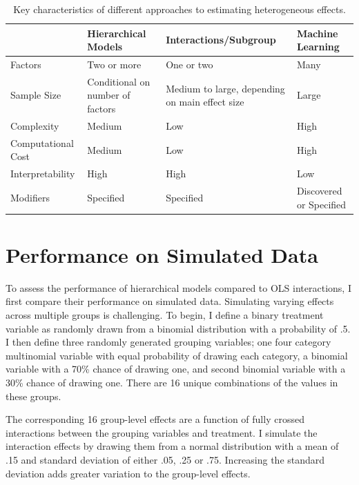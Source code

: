 \documentclass[12pt]{article}
\begin{document}
\begin{table}
\begin{tabular}{|p{1in}|p{1.5in}|p{1.5in}|p{1.5in}|} \hline
                 & Hierarchical Models & Interactions/Subgroup & Machine Learning \\
\hline
Factors              & Two or more          & One or two         & Many \\ \hline
Sample Size          & Conditional on number of factors            & Medium to large, depending on main effect size    & Large \\ \hline
Complexity           & Medium             & Low                & High \\ \hline
Computational Cost   & Medium             & Low                & High \\ \hline
Interpretability     & High               & High               & Low \\ \hline
Modifiers            & Specified          & Specified      & Discovered or Specified \\
\hline
\end{tabular}
\caption{Key characteristics of different approaches to estimating heterogeneous effects.}
\label{tab:tools-det}
\end{table}


\section{Performance on Simulated Data}

To assess the performance of hierarchical models compared to OLS interactions, I first compare their performance on simulated data. 
Simulating varying effects across multiple groups is challenging. 
To begin, I define a binary treatment variable as randomly drawn from a binomial distribution with a probability of .5.
I then define three randomly generated grouping variables; one four category multinomial variable with equal probability of drawing each category, a binomial variable with a 70\% chance of drawing one, and second binomial variable with a 30\% chance of drawing one. 
There are 16 unique combinations of the values in these groups. 


The corresponding 16 group-level effects are a function of fully crossed interactions between the grouping variables and treatment.
I simulate the interaction effects by drawing them from a normal distribution with a mean of .15 and standard deviation of either .05, .25 or .75. 
Increasing the standard deviation adds greater variation to the group-level effects.
\end{document}
